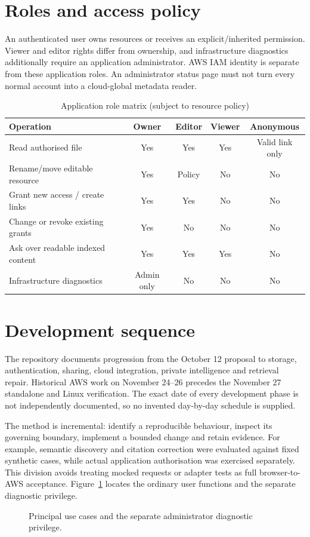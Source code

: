 \documentclass[11pt,a4paper,oneside]{report}
\newcommand{\ShortCaption}[1]{\csname ShortCaption#1\endcsname}
\newcommand{\diagram}[3]{\par\begin{figure}[htbp]\centering\sbox{\DiagramBox}{}\ifdim\wd\DiagramBox>\linewidth\resizebox{\linewidth}{!}{\usebox{\DiagramBox}}\else\usebox{\DiagramBox}\fi\caption[\ShortCaption{#1}]{#2}\label{fig:#3}\end{figure}\par}
\begin{document}
\section{Roles and access policy}
An authenticated user owns resources or receives an explicit/inherited permission. Viewer and editor rights differ from ownership, and infrastructure diagnostics additionally require an application administrator. AWS IAM identity is separate from these application roles. An administrator status page must not turn every normal account into a cloud-global metadata reader.
\par\begin{table}[htbp]\caption{Application role matrix (subject to resource policy)}\small\begin{tabularx}{\linewidth}{Ycccc}\toprule Operation&Owner&Editor&Viewer&Anonymous\\\midrule
Read authorised file&Yes&Yes&Yes&Valid link only\\
Rename/move editable resource&Yes&Policy&No&No\\
Grant new access / create links&Yes&Yes&No&No\\
Change or revoke existing grants&Yes&No&No&No\\
Ask over readable indexed content&Yes&Yes&Yes&No\\
Infrastructure diagnostics&Admin only&No&No&No\\\bottomrule\end{tabularx}\end{table}\par
\section{Development sequence}
The repository documents progression from the October 12 proposal to storage, authentication, sharing, cloud integration, private intelligence and retrieval repair. Historical AWS work on November 24--26 precedes the November 27 standalone and Linux verification. The exact date of every development phase is not independently documented, so no invented day-by-day schedule is supplied.

The method is incremental: identify a reproducible behaviour, inspect its governing boundary, implement a bounded change and retain evidence. For example, semantic discovery and citation correction were evaluated against fixed synthetic cases, while actual application authorisation was exercised separately. This division avoids treating mocked requests or adapter tests as full browser-to-AWS acceptance.
Figure~\ref{fig:usecases} locates the ordinary user functions and the separate diagnostic privilege.
\diagram{usecases}{Principal use cases and the separate administrator diagnostic privilege.}{usecases}
\FloatBarrier
\end{document}
